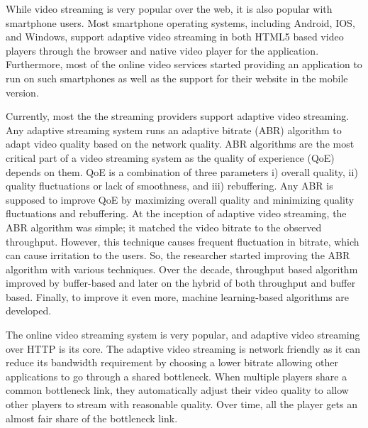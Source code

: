 While video streaming is very popular over the web, it is also popular with smartphone users. Most smartphone operating systems, including Android, IOS, and Windows, support adaptive video streaming in both HTML5 based video players through the browser and native video player for the application. Furthermore, most of the online video services started providing an application to run on such smartphones as well as the support for their website in the mobile version.

Currently, most the the streaming providers support adaptive video streaming. Any adaptive streaming system runs an adaptive bitrate (ABR) algorithm to adapt video quality based on the network quality. ABR algorithms are the most critical part of a video streaming system as the quality of experience (QoE) depends on them. QoE is a combination of three parameters\cite{yin2015control} i) overall quality, ii) quality fluctuations or lack of smoothness, and iii) rebuffering. Any ABR is supposed to improve QoE by maximizing overall quality and minimizing quality fluctuations and rebuffering. At the inception of adaptive video streaming, the ABR algorithm was simple; it matched the video bitrate to the observed throughput\cite{5677508,10.1145/1943552.1943575,10.1145/1943552.1943574}. However, this technique causes frequent fluctuation in bitrate, which can cause irritation to the users. So, the researcher started improving the ABR algorithm with various techniques. Over the decade, throughput based algorithm improved by buffer-based\cite{Spiteri2016,10.1145/2910017.2910596,7393865} and later on the hybrid of both throughput and buffer based\cite{7247436,140405,yin2015control,10.1145/2670518.2673877}. Finally, to improve it even more, machine learning-based\cite{mao2017neural,Akhtar2018,9155492} algorithms are developed.

The online video streaming system is very popular, and adaptive video streaming over HTTP is its core. The adaptive video streaming is network friendly as it can reduce its bandwidth requirement by choosing a lower bitrate allowing other applications to go through a shared bottleneck. When multiple players share a common bottleneck link, they automatically adjust their video quality to allow other players to stream with reasonable quality. Over time, all the player gets an almost fair share of the bottleneck link.